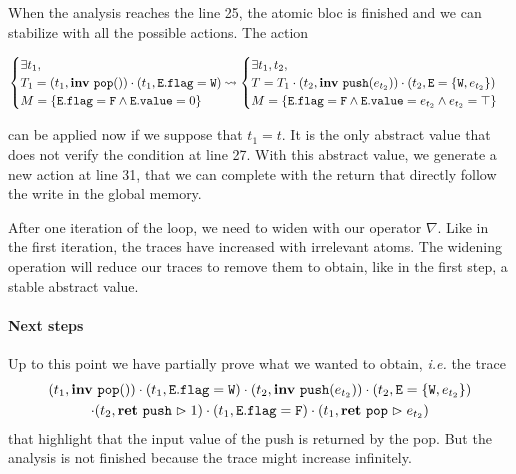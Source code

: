 When the analysis reaches the line 25, the atomic bloc is finished and we can stabilize with all the possible actions. The action
\begin{footnotesize}
\[\begin{cases}
	\exists t_1, \\
	T_1 = (t_1, \mathbf{inv}\ \mathtt{pop}())\cdot (t_1, \mathtt{E.flag} = \mathtt{W}) \\
	M = \{\mathtt{E.flag} = \mathtt{F} \wedge \mathtt{E.value} = 0\}
\end{cases} \!\!\!\!\!\!\!
\leadsto
\begin{cases}
	\exists t_1, t_2,\\
	T = T_1 \cdot (t_2, \mathbf{inv}\ \mathtt{push}(e_{t_2})) \cdot (t_2, \mathtt{E} = \{\mathtt{W}, e_{t_2}\})\\
	M = \{\mathtt{E.flag} = \mathtt{F} \wedge \mathtt{E.value} = e_{t_2} \wedge e_{t_2} = \top\}
\end{cases}
\]
\end{footnotesize}
can be applied now if we suppose that $t_1 = t$. It is the only abstract value that does not verify the condition at line 27. With this abstract value, we generate a new action at line 31, that we can complete with the return that directly follow the write in the global memory. 

After one iteration of the loop, we need to widen with our operator $\nabla$. Like in the first iteration, the traces have increased with irrelevant atoms. The widening operation will reduce our traces to remove them to obtain, like in the first step, a stable abstract value. 


\paragraph{Next steps} Up to this point we have partially prove what we wanted to obtain, \emph{i.e.} the trace
\begin{multline*}
(t_1, \mathbf{inv}\ \mathtt{pop}())\cdot (t_1, \mathtt{E.flag} = \mathtt{W}) \cdot (t_2, \mathbf{inv}\ \mathtt{push}(e_{t_2})) \cdot (t_2, \mathtt{E} = \{\mathtt{W}, e_{t_2}\}) \\
\cdot (t_2, \mathbf{ret}\ \mathtt{push} \vartriangleright 1) \cdot (t_1, \mathtt{E.flag} = \mathtt{F}) \cdot (t_1, \mathbf{ret}\ \mathtt{pop} \vartriangleright e_{t_2})
\end{multline*}
that highlight that the input value of the push is returned by the pop. But the analysis is not finished because the trace might increase infinitely. 


